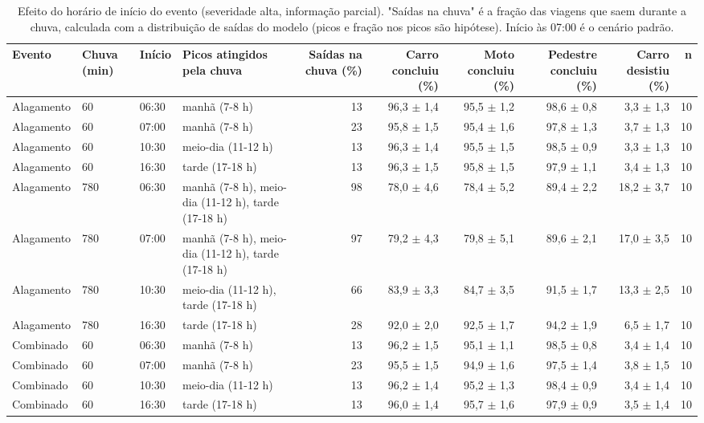 \begin{table}[htbp]
\centering
\scriptsize
\caption{Efeito do horário de início do evento (severidade alta, informação parcial). "Saídas na chuva" é a fração das viagens que saem durante a chuva, calculada com a distribuição de saídas do modelo (picos e fração nos picos são hipótese). Início às 07:00 é o cenário padrão.}
\label{tab:t6}
\begin{tabular}{llllrrrrrr}
\toprule
Evento & Chuva (min) & Início & Picos atingidos pela chuva & Saídas na chuva (\%) & Carro concluiu (\%) & Moto concluiu (\%) & Pedestre concluiu (\%) & Carro desistiu (\%) & n \\
\midrule
Alagamento & 60 & 06:30 & manhã (7-8 h) & 13 & 96,3 $\pm$ 1,4 & 95,5 $\pm$ 1,2 & 98,6 $\pm$ 0,8 & 3,3 $\pm$ 1,3 & 10 \\
Alagamento & 60 & 07:00 & manhã (7-8 h) & 23 & 95,8 $\pm$ 1,5 & 95,4 $\pm$ 1,6 & 97,8 $\pm$ 1,3 & 3,7 $\pm$ 1,3 & 10 \\
Alagamento & 60 & 10:30 & meio-dia (11-12 h) & 13 & 96,3 $\pm$ 1,4 & 95,5 $\pm$ 1,5 & 98,5 $\pm$ 0,9 & 3,3 $\pm$ 1,3 & 10 \\
Alagamento & 60 & 16:30 & tarde (17-18 h) & 13 & 96,3 $\pm$ 1,5 & 95,8 $\pm$ 1,5 & 97,9 $\pm$ 1,1 & 3,4 $\pm$ 1,3 & 10 \\
Alagamento & 780 & 06:30 & manhã (7-8 h), meio-dia (11-12 h), tarde (17-18 h) & 98 & 78,0 $\pm$ 4,6 & 78,4 $\pm$ 5,2 & 89,4 $\pm$ 2,2 & 18,2 $\pm$ 3,7 & 10 \\
Alagamento & 780 & 07:00 & manhã (7-8 h), meio-dia (11-12 h), tarde (17-18 h) & 97 & 79,2 $\pm$ 4,3 & 79,8 $\pm$ 5,1 & 89,6 $\pm$ 2,1 & 17,0 $\pm$ 3,5 & 10 \\
Alagamento & 780 & 10:30 & meio-dia (11-12 h), tarde (17-18 h) & 66 & 83,9 $\pm$ 3,3 & 84,7 $\pm$ 3,5 & 91,5 $\pm$ 1,7 & 13,3 $\pm$ 2,5 & 10 \\
Alagamento & 780 & 16:30 & tarde (17-18 h) & 28 & 92,0 $\pm$ 2,0 & 92,5 $\pm$ 1,7 & 94,2 $\pm$ 1,9 & 6,5 $\pm$ 1,7 & 10 \\
Combinado & 60 & 06:30 & manhã (7-8 h) & 13 & 96,2 $\pm$ 1,5 & 95,1 $\pm$ 1,1 & 98,5 $\pm$ 0,8 & 3,4 $\pm$ 1,4 & 10 \\
Combinado & 60 & 07:00 & manhã (7-8 h) & 23 & 95,5 $\pm$ 1,5 & 94,9 $\pm$ 1,6 & 97,5 $\pm$ 1,4 & 3,8 $\pm$ 1,5 & 10 \\
Combinado & 60 & 10:30 & meio-dia (11-12 h) & 13 & 96,2 $\pm$ 1,4 & 95,2 $\pm$ 1,3 & 98,4 $\pm$ 0,9 & 3,4 $\pm$ 1,4 & 10 \\
Combinado & 60 & 16:30 & tarde (17-18 h) & 13 & 96,0 $\pm$ 1,4 & 95,7 $\pm$ 1,6 & 97,9 $\pm$ 0,9 & 3,5 $\pm$ 1,4 & 10 \\

\end{tabular}
\end{table}
